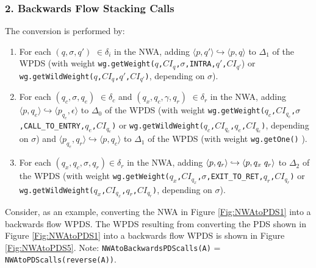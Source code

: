 \subsubsection{2. Backwards Flow Stacking Calls}

\noindent The conversion is performed by:

\begin{enumerate}

\item For each $(q,\sigma,q')$ $\in \delta_i$ in the NWA, adding $\langle
  p,q' \rangle \hookrightarrow \langle p,q \rangle$ to $\Delta_1$ of the WPDS
  (with weight
  \texttt{wg.getWeight($q$,$CI_q$,$\sigma$,INTRA,$q'$,$CI_{q'}$}) or
  \texttt{wg.getWildWeight($q$,$CI_q$,$q'$,$CI_{q'}$)}, depending on
  $\sigma$).

\item For each $(q_c,\sigma, q_e)$ $\in \delta_c$ and $(q_x,q_c,\gamma,q_r)$
  $\in \delta_r$ in the NWA, adding $\langle p,q_e \rangle \hookrightarrow
  \langle p_{q_e},\epsilon \rangle$ to $\Delta_0$ of the WPDS (with weight
  \texttt{wg.getWeight($q_c$,$CI_{q_c}$,$\sigma$,CALL\_TO\_ENTRY,$q_e$,$CI_{q_e}$)}
  or \texttt{wg.getWildWeight($q_c$,$CI_{q_c}$,$q_e$,$CI_{q_e}$)}, depending
  on $\sigma$) and $\langle p_{q_e},q_r \rangle \hookrightarrow \langle p,q_c
  \rangle$ to $\Delta_1$ of the WPDS (with weight \texttt{wg.getOne()} ).

\item For each $(q_x,q_c,\sigma,q_r) \in \delta_r$ in the NWA, adding
  $\langle p,q_r \rangle \hookrightarrow \langle p,q_x \hspace{.1cm} q_r
  \rangle$ to $\Delta_2$ of the WPDS (with weight
  \texttt{wg.getWeight($q_x$,$CI_{q_x}$,$\sigma$,EXIT\_TO\_RET,$q_r$,$CI_{q_r}$)}
  or \texttt{wg.getWildWeight($q_x$,$CI_{q_x}$,$q_r$,$CI_{q_r}$)}, depending
  on $\sigma$).

\end{enumerate}

\noindent Consider, as an example, converting the NWA in Figure
\ref{Fig:NWAtoPDS1} into a backwards flow WPDS.  The WPDS resulting from
converting the PDS shown in Figure \ref{Fig:NWAtoPDS1} into a backwards flow
WPDS is shown in Figure \ref{Fig:NWAtoPDS5}.  Note:
\texttt{NWAtoBackwardsPDScalls(A)} = \texttt{NWAtoPDScalls(reverse(A))}.  \\

